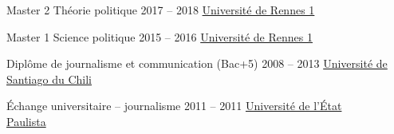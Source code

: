 \begin{yearlist}

\item[Master 2 Théorie politique]{2017 -- 2018}
     {\href{https://formations.univ-rennes1.fr/formations/master-2-theorie-politique}{Université de Rennes 1}}
		 {}
     

\item[Master 1 Science politique]{2015 -- 2016}
     {\href{https://formations.univ-rennes1.fr/formations/master-1-science-politique}{Université de Rennes 1}}
		 {}


\item[Diplôme de journalisme et communication (Bac+5)]{2008 -- 2013}
     {\href{http://periodismo.usach.cl/} {Université de Santiago du Chili}}
		 {}


\item[Échange universitaire -- journalisme]{2011 -- 2011}
     {\href{http://www.unesp.br/} {Université de l'État \\ Paulista}}
		 {}


\end{yearlist}





%
%



